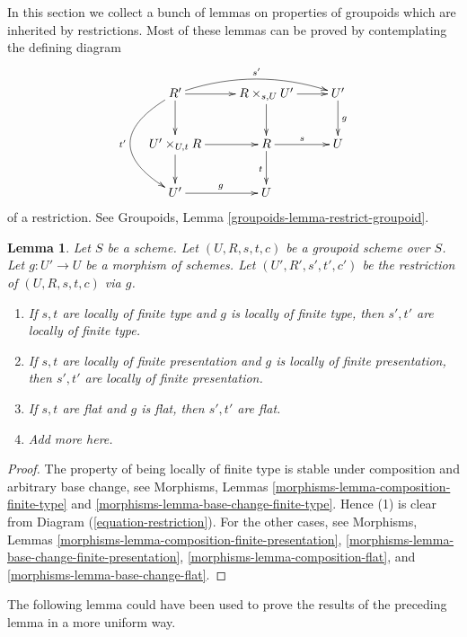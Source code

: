 \documentclass{stacks-project}
\theoremstyle{plain}
\newtheorem{lemma}[subsection]{Lemma}
\theoremstyle{definition}
\theoremstyle{remark}
\numberwithin{equation}{subsection}
\begin{document}
\noindent
In this section we collect a bunch of lemmas on
properties of groupoids which are inherited by restrictions.
Most of these lemmas can be proved by contemplating the
defining diagram
\begin{equation}
\label{equation-restriction}
\vcenter{
\xymatrix{
R' \ar[d] \ar[r] \ar@/_3pc/[dd]_{t'} \ar@/^1pc/[rr]^{s'}&
R \times_{s, U} U' \ar[r] \ar[d] &
U' \ar[d]^g \\
U' \times_{U, t} R \ar[d] \ar[r] &
R \ar[r]^s \ar[d]_t &
U \\
U' \ar[r]^g &
U
}
}
\end{equation}
of a restriction. See
Groupoids, Lemma \ref{groupoids-lemma-restrict-groupoid}.

\begin{lemma}
\label{lemma-restrict-preserves-type}
Let $S$ be a scheme.
Let $(U, R, s, t, c)$ be a groupoid scheme over $S$.
Let $g : U' \to U$ be a morphism of schemes.
Let $(U', R', s', t', c')$ be the restriction of
$(U, R, s, t, c)$ via $g$.
\begin{enumerate}
\item If $s, t$ are locally of finite type and $g$ is locally of finite
type, then $s', t'$ are locally of finite type.
\item If $s, t$ are locally of finite presentation and $g$ is locally of finite
presentation, then $s', t'$ are locally of finite presentation.
\item If $s, t$ are flat and $g$ is flat, then $s', t'$ are flat.
\item Add more here.
\end{enumerate}
\end{lemma}

\begin{proof}
The property of being locally of finite type is stable under composition
and arbitrary base change, see
Morphisms, Lemmas \ref{morphisms-lemma-composition-finite-type} and
\ref{morphisms-lemma-base-change-finite-type}.
Hence (1) is clear from Diagram (\ref{equation-restriction}).
For the other cases, see
Morphisms, Lemmas \ref{morphisms-lemma-composition-finite-presentation},
\ref{morphisms-lemma-base-change-finite-presentation},
\ref{morphisms-lemma-composition-flat}, and
\ref{morphisms-lemma-base-change-flat}.
\end{proof}

\noindent
The following lemma could have been used to prove the results of the preceding
lemma in a more uniform way.
\end{document}
